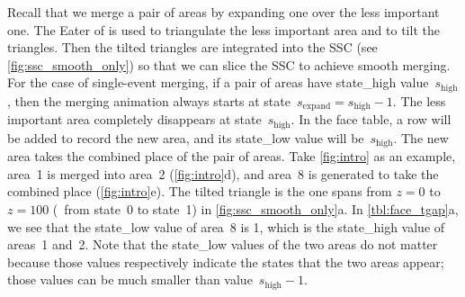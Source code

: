 \documentclass[ijgi,article,submit,moreauthors,pdftex]{Definitions/mdpi}
\begin{document}
Recall that we merge a pair of areas by expanding one over 
the less important one.
The Eater of \citet{Suba2014Merge} is used to 
triangulate the less important area and to tilt the triangles.
Then the tilted triangles are integrated into the SSC
(see \fig\ref{fig:ssc_smooth_only})
so that we can slice the SSC to achieve smooth merging.
For the case of single-event merging,
if a pair of areas have state\_high value~$s_\mathrm{high}$,
then the merging animation 
always starts at state~$s_\mathrm{expand}=s_\mathrm{high}-1$.
The less important area completely disappears
at state~$s_\mathrm{high}$.
In the face table, a row will be added 
to record the new area, and its state\_low value will be~$s_\mathrm{high}$.
The new area takes the combined place of the pair of areas.
Take \ref{fig:intro} as an example, 
area~1 is merged into area~2 (\figs\ref{fig:intro}d), 
and area~8 is generated to take the combined place (\figs\ref{fig:intro}e).
The tilted triangle is the one spans 
from $z= 0$ to $z=100$ (\ie~from state~0 to state~1)
in \fig\ref{fig:ssc_smooth_only}a.
In \tbl\ref{tbl:face_tgap}a, we see that
the state\_low value of area~8 is 1,
which is the state\_high value of areas~1 and~2.
Note that the state\_low values of the two areas do not matter 
because those values respectively indicate the states that
the two areas appear;
those values can be much smaller 
than value~$s_\mathrm{high}-1$.
\end{document}
